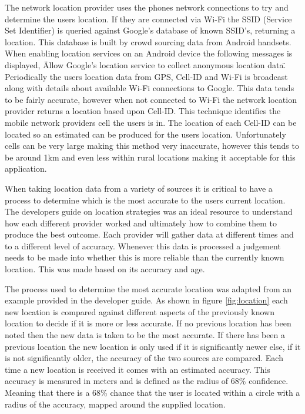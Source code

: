 The network location provider uses the phones network connections to try and determine the users location. If they are connected via Wi-Fi the SSID (Service Set Identifier) is queried against Google's database of known SSID's, returning a location. This database is built by crowd sourcing data from Android handsets. When enabling location services on an Android device the following messages is displayed, \"Allow Google's location service to collect anonymous location data\". Periodically the users location data from GPS, Cell-ID and Wi-Fi is broadcast along with details about available Wi-Fi connections to Google. This data tends to be fairly accurate, however when not connected to Wi-Fi the network location provider returns a location based upon Cell-ID. This technique identifies the mobile network providers cell the users is in. The location of each Cell-ID can be located so an estimated can be produced for the users location. Unfortunately cells can be very large making this method very inaccurate, however this tends to be around 1km and even less within rural locations\cite{1377314} making it acceptable for this application.

When taking location data from a variety of sources it is critical to have a process to determine which is the most accurate to the users current location. The developers guide on location strategies\cite{location} was an ideal resource to understand how each different provider worked and ultimately how to combine them to produce the best outcome. Each provider will gather data at different times and to a different level of accuracy. Whenever this data is processed a judgement needs to be made into whether this is more reliable than the currently known location. This was made based on its accuracy and age.

The process used to determine the most accurate location was adapted from an example provided in the developer guide. As shown in figure \ref{fig:location} each new location is compared against different aspects of the previously known location to decide if it is more or less accurate. If no previous location has been noted then the new data is taken to be the most accurate. If there has been a previous location the new location is only used if it is significantly newer else, if it is not significantly older, the accuracy of the two sources are compared. Each time a new location is received it comes with an estimated accuracy. This accuracy is measured in meters and is defined as the radius of 68\% confidence\cite{location_accuracy}. Meaning that there is a 68\% chance that the user is located within a circle with a radius of the accuracy, mapped around the supplied location.

